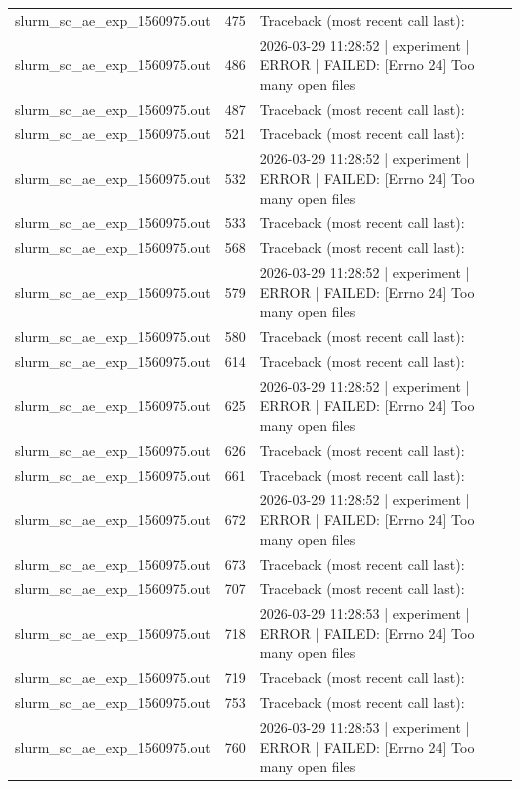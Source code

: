 \begin{tabular}{lrl}
slurm\_sc\_ae\_exp\_1560975.out & 475 & Traceback (most recent call last): \\
slurm\_sc\_ae\_exp\_1560975.out & 486 & 2026-03-29 11:28:52 | experiment | ERROR |   FAILED: [Errno 24] Too many open files \\
slurm\_sc\_ae\_exp\_1560975.out & 487 & Traceback (most recent call last): \\
slurm\_sc\_ae\_exp\_1560975.out & 521 & Traceback (most recent call last): \\
slurm\_sc\_ae\_exp\_1560975.out & 532 & 2026-03-29 11:28:52 | experiment | ERROR |   FAILED: [Errno 24] Too many open files \\
slurm\_sc\_ae\_exp\_1560975.out & 533 & Traceback (most recent call last): \\
slurm\_sc\_ae\_exp\_1560975.out & 568 & Traceback (most recent call last): \\
slurm\_sc\_ae\_exp\_1560975.out & 579 & 2026-03-29 11:28:52 | experiment | ERROR |   FAILED: [Errno 24] Too many open files \\
slurm\_sc\_ae\_exp\_1560975.out & 580 & Traceback (most recent call last): \\
slurm\_sc\_ae\_exp\_1560975.out & 614 & Traceback (most recent call last): \\
slurm\_sc\_ae\_exp\_1560975.out & 625 & 2026-03-29 11:28:52 | experiment | ERROR |   FAILED: [Errno 24] Too many open files \\
slurm\_sc\_ae\_exp\_1560975.out & 626 & Traceback (most recent call last): \\
slurm\_sc\_ae\_exp\_1560975.out & 661 & Traceback (most recent call last): \\
slurm\_sc\_ae\_exp\_1560975.out & 672 & 2026-03-29 11:28:52 | experiment | ERROR |   FAILED: [Errno 24] Too many open files \\
slurm\_sc\_ae\_exp\_1560975.out & 673 & Traceback (most recent call last): \\
slurm\_sc\_ae\_exp\_1560975.out & 707 & Traceback (most recent call last): \\
slurm\_sc\_ae\_exp\_1560975.out & 718 & 2026-03-29 11:28:53 | experiment | ERROR |   FAILED: [Errno 24] Too many open files \\
slurm\_sc\_ae\_exp\_1560975.out & 719 & Traceback (most recent call last): \\
slurm\_sc\_ae\_exp\_1560975.out & 753 & Traceback (most recent call last): \\
slurm\_sc\_ae\_exp\_1560975.out & 760 & 2026-03-29 11:28:53 | experiment | ERROR |   FAILED: [Errno 24] Too many open files \\

\end{tabular}
